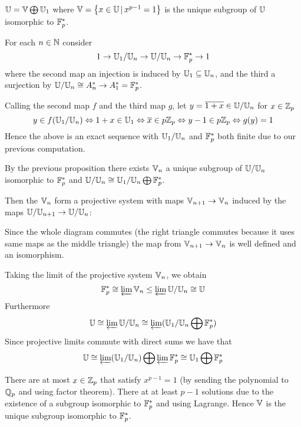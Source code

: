 \begin{prop}[$\U = \V \bigoplus \U_1$]
    $\U = \V \bigoplus \U_1$ where 
    $\mathbb{V} = \left\{x \in \mathbb{U} \,|\, x^{p-1} = 1\right\}$ 
    is the unique subgroup of $\mathbb{U}$ isomorphic to $\mathbb{F}^*_p$.
\end{prop}
\begin{prop}
    For each $n \in \mathbb{N}$ consider 
    \[1 \to \mathbb{U}_1 / \mathbb{U}_n \to \mathbb{U} / \mathbb{U}_n \to \mathbb{F}_p^* \to 1\]
    where the second map an injection is induced by 
    $\mathbb{U}_1 \subseteq \mathbb{U}_n$,
    and the third a surjection by 
    $\mathbb{U} / \mathbb{U}_n \cong A_n^* \to A_1^* = \mathbb{F}_p^*$.

    Calling the second map $f$ and the third map $g$,
    let $y = \overline{1 + x} \in \mathbb{U} / \mathbb{U}_n$ for $x \in \mathbb{Z}_p$
    \[y \in f(\mathbb{U}_1/\mathbb{U}_n) \Leftrightarrow 1 + x \in \mathbb{U}_1 
    \Leftrightarrow \overline{x} \in p \mathbb{Z}_p \Leftrightarrow y - 1 \in p \mathbb{Z}_p
    \Leftrightarrow g(y) = 1\]
    Hence the above is an exact sequence with 
    $\mathbb{U}_1 / \mathbb{U}_n$ and $\mathbb{F}_p^*$ 
    both finite due to our previous computation.

    By the previous proposition there exists $\mathbb{V}_n$
    a unique subgroup of $\mathbb{U} / \mathbb{U}_n$ isomorphic to $\mathbb{F}_p^*$
    and $\mathbb{U} / \mathbb{U}_n \cong \mathbb{U}_1 / \mathbb{U}_n \bigoplus \mathbb{F}_p^*$.

    Then the $\mathbb{V}_n$ form a projective system 
    with maps $\mathbb{V}_{n+1} \to \mathbb{V}_n$ induced by 
    the maps $\mathbb{U} / \mathbb{U}_{n+1} \to \mathbb{U} / \mathbb{U}_n$:
    \begin{center}
    \end{center}
    Since the whole diagram commutes
    (the right triangle commutes because it uses 
    same maps as the middle triangle)
    the map from $\mathbb{V}_{n+1} \to \mathbb{V}_n$ 
    is well defined and an isomorphism.

    Taking the limit of the projective system 
    $\mathbb{V}_n$, we obtain 
    \[\mathbb{F}_p^* \cong \varprojlim \mathbb{V}_n \le 
    \varprojlim \mathbb{U} / \mathbb{U}_n \cong \mathbb{U}\]
    Furthermore 
    \[\mathbb{U} \cong \varprojlim \mathbb{U} / \mathbb{U}_n 
    \cong \varprojlim (\mathbb{U}_1 / \mathbb{U}_n \bigoplus \mathbb{F}_p^*)
    \]
    Since projective limits commute with direct sums %
    we have that 
    \[\mathbb{U} \cong \varprojlim (\mathbb{U}_1 / \mathbb{U}_n) \bigoplus \varprojlim \mathbb{F}_p^*
    \cong \mathbb{U}_1 \bigoplus \mathbb{F}_p^*
    \]

    There are at most $x \in \mathbb{Z}_p$ that satisfy $x^{p-1} = 1$ 
    (by sending the polynomial to $\mathbb{Q}_p$ and using factor theorem).
    There at at least $p - 1$ solutions due to the existence of 
    a subgroup isomorphic to $\mathbb{F}_p^*$ and using Lagrange.
    Hence $\mathbb{V}$ is the unique subgroup isomorphic to $\mathbb{F}_p^*$.
\end{prop}


